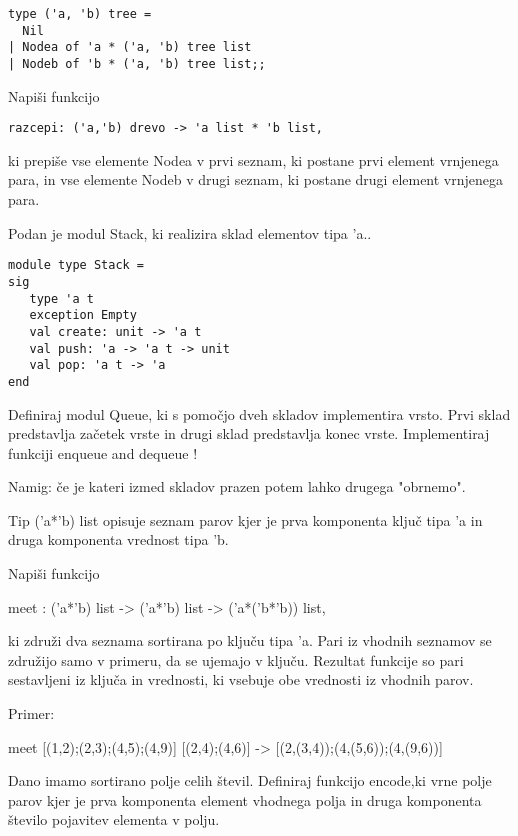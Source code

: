 \begin{ex}
\begin{verbatim}
type ('a, 'b) tree = 
  Nil
| Nodea of 'a * ('a, 'b) tree list 
| Nodeb of 'b * ('a, 'b) tree list;; 

\end{verbatim}
Napi\v si funkcijo 

\begin{verbatim}
razcepi: ('a,'b) drevo -> 'a list * 'b list, 
\end{verbatim}

ki prepi\v se vse elemente Nodea v prvi seznam, ki postane prvi element vrnjenega para, in vse elemente Nodeb v drugi seznam, ki postane drugi element vrnjenega para.


\end{ex} \begin{ex}
Podan je modul Stack, ki realizira sklad elementov tipa 'a.. 

\begin{verbatim}
module type Stack = 
sig 
   type 'a t 
   exception Empty 
   val create: unit -> 'a t 
   val push: 'a -> 'a t -> unit 
   val pop: 'a t -> 'a 
end

\end{verbatim}
Definiraj modul Queue, ki s pomo\v cjo dveh skladov implementira vrsto. Prvi sklad predstavlja za\v cetek vrste in drugi sklad predstavlja konec vrste. Implementiraj funkciji enqueue and dequeue !

Namig: \v ce je kateri izmed skladov prazen potem lahko drugega "obrnemo". 


\end{ex} \begin{ex}
Tip ('a*'b) list opisuje seznam parov kjer je prva komponenta klju\v c tipa 'a in druga komponenta vrednost tipa 'b. 

Napi\v si funkcijo 

meet : ('a*'b) list -> ('a*'b) list -> ('a*('b*'b)) list,

ki zdru\v zi dva seznama sortirana po klju\v cu tipa 'a. Pari iz vhodnih seznamov se zdru\v zijo samo v primeru, da se ujemajo v klju\v cu. Rezultat funkcije so pari sestavljeni iz klju\v ca in vrednosti, ki vsebuje obe vrednosti iz vhodnih parov.  

Primer:    

meet [(1,2);(2,3);(4,5);(4,9)] [(2,4);(4,6)] -> 
     [(2,(3,4));(4,(5,6));(4,(9,6))]


\end{ex} \begin{ex}
Dano imamo sortirano polje celih \v stevil. Definiraj funkcijo encode,ki vrne polje parov kjer je prva komponenta element vhodnega polja in druga komponenta \v stevilo pojavitev elementa v polju.   


\end{ex}
